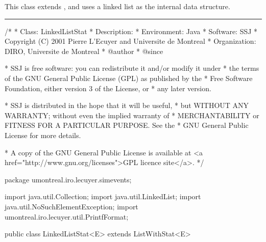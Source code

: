 
This class extends , and
uses a linked list as the internal data structure.


\bigskip\hrule


\begin{code}
\begin{hide}
/*
 * Class:        LinkedListStat
 * Description:  
 * Environment:  Java
 * Software:     SSJ 
 * Copyright (C) 2001  Pierre L'Ecuyer and Universite de Montreal
 * Organization: DIRO, Universite de Montreal
 * @author       
 * @since

 * SSJ is free software: you can redistribute it and/or modify it under
 * the terms of the GNU General Public License (GPL) as published by the
 * Free Software Foundation, either version 3 of the License, or
 * any later version.

 * SSJ is distributed in the hope that it will be useful,
 * but WITHOUT ANY WARRANTY; without even the implied warranty of
 * MERCHANTABILITY or FITNESS FOR A PARTICULAR PURPOSE.  See the
 * GNU General Public License for more details.

 * A copy of the GNU General Public License is available at
   <a href="http://www.gnu.org/licenses">GPL licence site</a>.
 */
\end{hide}
package umontreal.iro.lecuyer.simevents;
\begin{hide}
import java.util.Collection;
import java.util.LinkedList;
import java.util.NoSuchElementException;
import umontreal.iro.lecuyer.util.PrintfFormat;
\end{hide}

public class LinkedListStat<E> extends ListWithStat<E>\begin{hide} {
\end{hide}\end{code}

